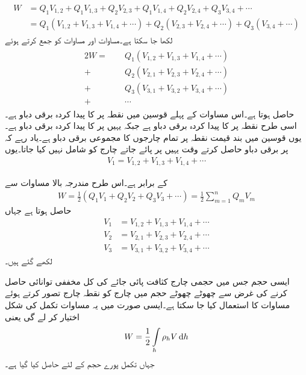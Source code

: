 \begin{gather}
\begin{aligned}\label{مساوات_توانائی_چارج_کثافت_توانائی_ب}
W&=Q_1 V_{1,2}+Q_1 V_{1,3} +Q_2 V_{2,3}+Q_1 V_{1,4} +Q_2 V_{2,4}+Q_3 V_{3,4}+\cdots\\
&=Q_1 (V_{1,2}+V_{1,3} + V_{1,4} +\cdots)+Q_2 (V_{2,3}+V_{2,4}+\cdots)+Q_3(V_{3,4}+\cdots)
\end{aligned}
\end{gather}
  لکھا جا سکتا ہے۔مساوات  اور مساوات  کو جمع کرتے ہوئے
\begin{gather}
\begin{aligned}
2 W=\phantom{+}&Q_1(V_{1,2}+V_{1,3} + V_{1,4} +\cdots)\\
+&Q_2 (V_{2,1}+V_{2,3}+V_{2,4}+\cdots)\\
+&Q_3( V_{3,1}+V_{3,2}+V_{3,4}+\cdots)\\
+&\cdots
\end{aligned}
\end{gather}
حاصل ہوتا ہے۔اس مساوات کے پہلے قوسین میں  نقطہ  پر  کا پیدا کردہ برقی دباو ہے۔اسی طرح  نقطہ  پر  کا پیدا کردہ برقی دباو ہے جبکہ  یہیں پر  کا پیدا کردہ برقی دباو ہے۔یوں قوسین میں بند قیمت نقطہ  پر تمام چارجوں کا مجموعی برقی دباو  ہے۔یاد رہے کہ  پر برقی دباو حاصل کرتے وقت یہیں پر پائے جاتے چارج  کو شامل نہیں کیا جاتا۔یوں
\begin{align*}
V_1=V_{1,2}+V_{1,3} + V_{1,4} +\cdots
\end{align*}

کے برابر ہے۔اس طرح مندرجہ بالا مساوات سے
\begin{align}\label{مساوات_توانائی_چارج_کثافت_توانائی_پ}
W=\frac{1}{2}\left(Q_1 V_1+Q_2 V_2+Q_3 V_3+\cdots\right)=\frac{1}{2}\sum_{m=1}^{n} Q_m V_m
\end{align}
حاصل ہوتا ہے جہاں 
\begin{align*}
V_1&=V_{1,2}+V_{1,3} + V_{1,4} +\cdots\\
V_2&=V_{2,1}+V_{2,3}+V_{2,4}+\cdots\\
V_3&=V_{3,1}+V_{3,2}+V_{3,4}+\cdots
\end{align*}
لکھے گئے ہیں۔

ایسی حجم جس میں حجمی چارج کثافت  پائی جائے کی کل مخففی توانائی حاصل کرنے کی غرض سے  چھوٹے چھوٹے حجم  میں چارج  کو نقطہ چارج تصور کرتے ہوئے مساوات  کا استعمال کیا جا سکتا ہے۔ایسی صورت میں یہ مساوات تکمل کی شکل اختیار کر لے گی یعنی
 \begin{align}\label{مساوات_توانائی_کثافت_تونائی}
W=\frac{1}{2}\int \limits_h \rho_h V \dif h
\end{align}
جہاں تکمل پورے حجم  کے لئے حاصل کیا گیا ہے۔


